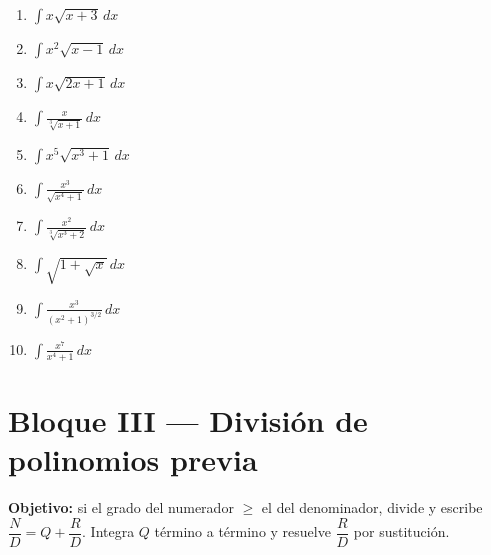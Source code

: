 \documentclass[12pt, letterpaper]{article}
\newcommand{\dx}{\,dx}
\begin{document}
\begin{enumerate}[label=\textbf{\arabic*.}, leftmargin=*, itemsep=9pt, start=9]

  \item \dificil\quad $\displaystyle\int x\sqrt{x+3}\dx$

  \item \muyDificil\quad $\displaystyle\int x^{2}\sqrt{x-1}\dx$

  \item \dificil\quad $\displaystyle\int x\sqrt{2x+1}\dx$

  \item \dificil\quad $\displaystyle\int \frac{x}{\sqrt[3]{x+1}}\dx$

  \item \muyDificil\quad $\displaystyle\int x^{5}\sqrt{x^{3}+1}\dx$

  \item \dificil\quad $\displaystyle\int \frac{x^{3}}{\sqrt{x^{4}+1}}\dx$

  \item \dificil\quad $\displaystyle\int \frac{x^{2}}{\sqrt[3]{x^{3}+2}}\dx$

  \item \muyDificil\quad $\displaystyle\int \sqrt{1+\sqrt{x}}\dx$

  \item \muyDificil\quad $\displaystyle\int \frac{x^{3}}{(x^{2}+1)^{3/2}}\dx$

  \item \muyDificil\quad $\displaystyle\int \frac{x^{7}}{x^{4}+1}\dx$

\end{enumerate}

\vspace{6pt}

\section{Bloque III — División de polinomios previa}

\begin{cuadroinfo}
\small
\textbf{Objetivo:} si el grado del numerador $\geq$ el del denominador, divide y
escribe $\dfrac{N}{D} = Q + \dfrac{R}{D}$. Integra $Q$ término a término y resuelve
$\dfrac{R}{D}$ por sustitución.
\end{cuadroinfo}

\vspace{4pt}
\end{document}
